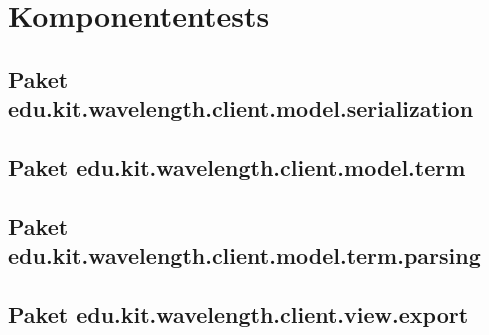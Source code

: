 \documentclass[parskip=full,11pt,twoside]{scrartcl}
\begin{document}
\section{Komponententests}
\subsection{Paket edu.kit.wavelength.client.model.serialization}

\subsection{Paket edu.kit.wavelength.client.model.term}

\subsection{Paket edu.kit.wavelength.client.model.term.parsing}

\subsection{Paket edu.kit.wavelength.client.view.export}
\end{document}
